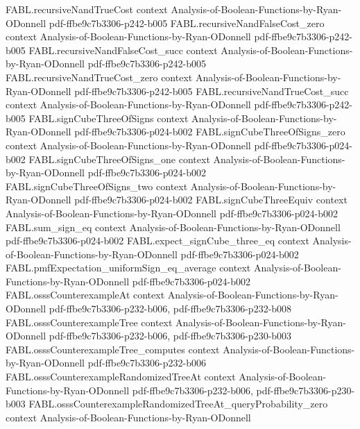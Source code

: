 \begin{theorem}
\proofstep
  {FABL.recursiveNandTrueCost}
  {context}
  {Analysis-of-Boolean-Functions-by-Ryan-ODonnell}
  {pdf-ffbe9c7b3306-p242-b005}
\proofstep
  {FABL.recursiveNandFalseCost_zero}
  {context}
  {Analysis-of-Boolean-Functions-by-Ryan-ODonnell}
  {pdf-ffbe9c7b3306-p242-b005}
\proofstep
  {FABL.recursiveNandFalseCost_succ}
  {context}
  {Analysis-of-Boolean-Functions-by-Ryan-ODonnell}
  {pdf-ffbe9c7b3306-p242-b005}
\proofstep
  {FABL.recursiveNandTrueCost_zero}
  {context}
  {Analysis-of-Boolean-Functions-by-Ryan-ODonnell}
  {pdf-ffbe9c7b3306-p242-b005}
\proofstep
  {FABL.recursiveNandTrueCost_succ}
  {context}
  {Analysis-of-Boolean-Functions-by-Ryan-ODonnell}
  {pdf-ffbe9c7b3306-p242-b005}
\proofstep
  {FABL.signCubeThreeOfSigns}
  {context}
  {Analysis-of-Boolean-Functions-by-Ryan-ODonnell}
  {pdf-ffbe9c7b3306-p024-b002}
\proofstep
  {FABL.signCubeThreeOfSigns_zero}
  {context}
  {Analysis-of-Boolean-Functions-by-Ryan-ODonnell}
  {pdf-ffbe9c7b3306-p024-b002}
\proofstep
  {FABL.signCubeThreeOfSigns_one}
  {context}
  {Analysis-of-Boolean-Functions-by-Ryan-ODonnell}
  {pdf-ffbe9c7b3306-p024-b002}
\proofstep
  {FABL.signCubeThreeOfSigns_two}
  {context}
  {Analysis-of-Boolean-Functions-by-Ryan-ODonnell}
  {pdf-ffbe9c7b3306-p024-b002}
\proofstep
  {FABL.signCubeThreeEquiv}
  {context}
  {Analysis-of-Boolean-Functions-by-Ryan-ODonnell}
  {pdf-ffbe9c7b3306-p024-b002}
\proofstep
  {FABL.sum_sign_eq}
  {context}
  {Analysis-of-Boolean-Functions-by-Ryan-ODonnell}
  {pdf-ffbe9c7b3306-p024-b002}
\proofstep
  {FABL.expect_signCube_three_eq}
  {context}
  {Analysis-of-Boolean-Functions-by-Ryan-ODonnell}
  {pdf-ffbe9c7b3306-p024-b002}
\proofstep
  {FABL.pmfExpectation_uniformSign_eq_average}
  {context}
  {Analysis-of-Boolean-Functions-by-Ryan-ODonnell}
  {pdf-ffbe9c7b3306-p024-b002}
\proofstep
  {FABL.osssCounterexampleAt}
  {context}
  {Analysis-of-Boolean-Functions-by-Ryan-ODonnell}
  {pdf-ffbe9c7b3306-p232-b006,
    pdf-ffbe9c7b3306-p232-b008}
\proofstep
  {FABL.osssCounterexampleTree}
  {context}
  {Analysis-of-Boolean-Functions-by-Ryan-ODonnell}
  {pdf-ffbe9c7b3306-p232-b006,
    pdf-ffbe9c7b3306-p230-b003}
\proofstep
  {FABL.osssCounterexampleTree_computes}
  {context}
  {Analysis-of-Boolean-Functions-by-Ryan-ODonnell}
  {pdf-ffbe9c7b3306-p232-b006}
\proofstep
  {FABL.osssCounterexampleRandomizedTreeAt}
  {context}
  {Analysis-of-Boolean-Functions-by-Ryan-ODonnell}
  {pdf-ffbe9c7b3306-p232-b006,
    pdf-ffbe9c7b3306-p230-b003}
\proofstep
  {FABL.osssCounterexampleRandomizedTreeAt_queryProbability_zero}
  {context}
  {Analysis-of-Boolean-Functions-by-Ryan-ODonnell}

\end{theorem}
